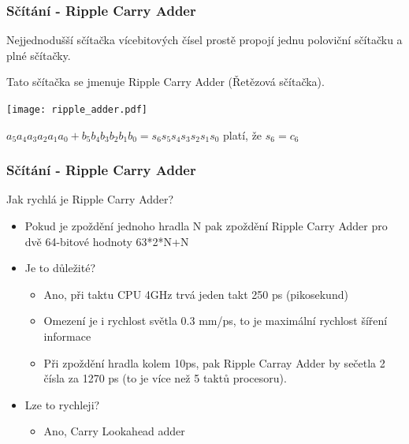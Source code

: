 \documentclass{beamer}
\begin{document}
\begin{frame}
\frametitle{Sčítání - Ripple Carry Adder}

Nejjednodušší sčítačka vícebitových čísel prostě propojí jednu poloviční sčítačku a plné sčítačky. 

Tato sčítačka se jmenuje Ripple Carry Adder (Řetězová sčítačka).

\begin{center}
   \texttt{[image: ripple\_adder.pdf]}
\end{center}

$a_5a_4a_3a_2a_1a_0 + b_5b_4b_3b_2b_1b_0 = s_6s_5s_4s_3s_2s_1s_0$ platí, že $s_6 = c_6$

\end{frame}

\begin{frame}
\frametitle{Sčítání - Ripple Carry Adder}

Jak rychlá je Ripple Carry Adder?
\begin{itemize}
\item Pokud je zpoždění jednoho hradla N pak zpoždění Ripple Carry Adder pro dvě 64-bitové hodnoty 63*2*N+N
\item Je to důležité?
\begin{itemize}
\item Ano, při taktu CPU 4GHz trvá jeden takt 250 ps (pikosekund)
\item Omezení je i rychlost světla 0.3 mm/ps, to je maximální rychlost šíření informace
\item Při zpoždění hradla kolem 10ps, pak Ripple Carray Adder by sečetla 2 čísla za 1270 ps (to je více než 5 taktů procesoru).  
\end{itemize}
\item Lze to rychleji?
\begin{itemize}
\item Ano, Carry Lookahead adder
\end{itemize}
\end{itemize}

\end{frame}
\end{document}
